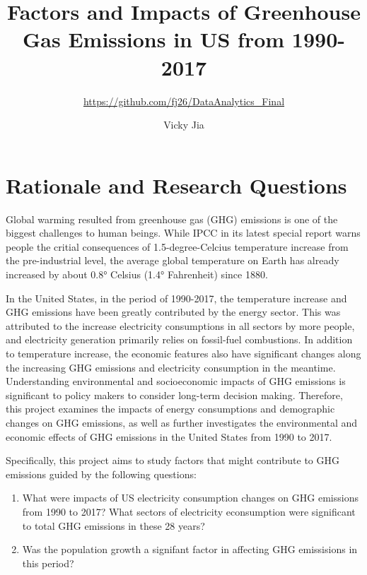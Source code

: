 \documentclass[12pt,]{article}
\title{Factors and Impacts of Greenhouse Gas Emissions in US from 1990-2017}
\subtitle{\url{https://github.com/fj26/DataAnalytics_Final}}
\author{Vicky Jia}
\date{}
\providecommand{\tightlist}{%
  \setlength{\itemsep}{0pt}\setlength{\parskip}{0pt}}
\begin{document}
\maketitle

\newpage

\tableofcontents  \newpage
\listoftables  \newpage
\listoffigures  \newpage

\section{Rationale and Research
Questions}\label{rationale-and-research-questions}

Global warming resulted from greenhouse gas (GHG) emissions is one of
the biggest challenges to human beings. While IPCC in its latest special
report warns people the critial consequences of 1.5-degree-Celcius
temperature increase from the pre-industrial level, the average global
temperature on Earth has already increased by about 0.8° Celsius (1.4°
Fahrenheit) since 1880.

In the United States, in the period of 1990-2017, the temperature
increase and GHG emissions have been greatly contributed by the energy
sector. This was attributed to the increase electricity consumptions in
all sectors by more people, and electricity generation primarily relies
on fossil-fuel combustions. In addition to temperature increase, the
economic features also have significant changes along the increasing GHG
emissions and electricity consumption in the meantime. Understanding
environmental and socioeconomic impacts of GHG emissions is significant
to policy makers to consider long-term decision making. Therefore, this
project examines the impacts of energy consumptions and demographic
changes on GHG emissions, as well as further investigates the
environmental and economic effects of GHG emissions in the United States
from 1990 to 2017.

Specifically, this project aims to study factors that might contribute
to GHG emissions guided by the following questions:

\begin{enumerate}
\def\labelenumi{\arabic{enumi}.}
\tightlist
\item
  What were impacts of US electricity consumption changes on GHG
  emissions from 1990 to 2017? What sectors of electricity econsumption
  were significant to total GHG emissions in these 28 years?
\item
  Was the population growth a signifant factor in affecting GHG
  emissisions in this period?
\end{enumerate}
\end{document}
